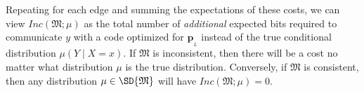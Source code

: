 \documentclass{article}
\theoremstyle{plain}
\theoremstyle{definition}
\theoremstyle{remark}
\newcommand\mat[1]{\mathbf{#1}}
\newcommand{\bp}[1][L]{\mat{p}_{\!_{#1}\!}}
\newcommand{\dg}[1]{\mathfrak{#1}}
\newcommand\Inc{\mathit{Inc}}
\numberwithin{equation}{section}
\begin{document}
{		Repeating for each edge and summing the expectations of these costs, we can view
		$\Inc(\dg M;\mu)$ as the total number of \emph{additional} expected
        bits required to communicate $y$ with a code optimized for
        $\bp$ instead of the true conditional distribution
                $\mu(Y \mid X=x)$. 
	If $\dg M$ is inconsistent, then there will be a cost no matter
        what distribution $\mu$ is the true distribution.
	Conversely, if $\dg M$ is consistent, then any distribution
        $\mu \in \SD{\dg M}$ will have $\Inc(\dg M; \mu) = 0$.  
}	
\end{document}
